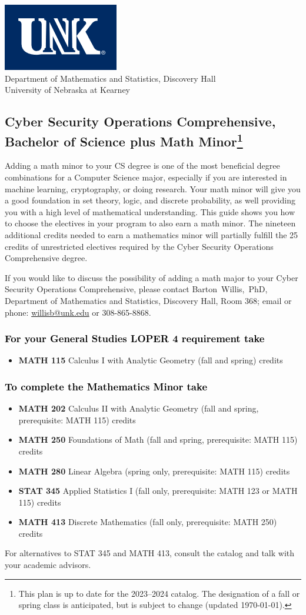 \documentclass[10pt]{article}
\makeatletter
\newenvironment{mypar}[2]
   {\begin{list}{}%
     {\setlength\leftmargin{#1}
     \setlength\rightmargin{#2}}
     \item[]}
   {\end{list}}
\newcommand{\calcone}{\textbf{MATH 115} Calculus I with Analytic Geometry (fall and spring) \dotfill 5 credits}
\newcommand{\calctwo}{\textbf{MATH 202} Calculus II with Analytic Geometry (fall and spring, prerequisite: MATH 115) \dotfill 5 credits }
\newcommand{\foundations}{\textbf{MATH 250} Foundations of Math (fall and spring, prerequisite: MATH 115)  \dotfill 3 credits}
\newcommand{\linear}{\textbf{MATH 280} Linear Algebra (spring only, prerequisite: MATH 115) \dotfill 3 credits}
\newcommand{\discrete}{\textbf{MATH 413} Discrete Mathematics  (fall only, prerequisite: MATH 250)\dotfill 3 credits}
\newcommand{\discreteshort}{MATH 413}
\newcommand{\appliedstat}{\textbf{STAT 345} Applied Statistics I (fall only, prerequisite: MATH 123 or MATH 115) \dotfill 3 credits}
\newcommand{\appliedstatshort}{STAT 345}
\newcommand{\contactbw}{\mbox{Barton Willis, PhD}, Department of Mathematics and Statistics,  Discovery Hall, Room 368;
email or phone: \href{mailto:willisb@unk.edu}{willisb@unk.edu} or 308-865-8868.}
\newcommand{\forinfo}[2]{If you would like to discuss the possibility of adding a math {#1} to your {#2}, please contact \contactbw}
\newcommand{\catalog}{2023--2024 }
\newcommand{\LOPER}{LOPER\xspace}
\newcommand{\myfootnote}{\footnote{This plan is up to date for  the \catalog catalog. The designation of a fall or spring class is 
anticipated, but  is subject to change (updated \today).}}
\newcommand{\myheading}{
\begin{flushleft}
\includegraphics[scale=0.35]{unk-logo}\\
\setcounter{footnote}{0}
\vspace{0.25in}
 \textcolor{unkblue}{Department of Mathematics and Statistics, Discovery Hall} \\
  \textcolor{unkblue}{University of Nebraska at Kearney}
\end{flushleft}}
\makeatother
\begin{document}


\myheading

\subsection*{\textbf{\textcolor{unkblue}{Cyber Security Operations Comprehensive, Bachelor of Science plus Math Minor\myfootnote}}}

Adding a math minor to your CS degree is one of the most beneficial degree combinations 
for a Computer Science major, especially if you are interested in machine learning, 
cryptography,  or doing research.  Your math minor will give you a good foundation in 
set theory, logic, and discrete probability, as well providing you with a high level of 
mathematical understanding. This guide shows you how to choose the electives in your program to also 
earn a math minor. The nineteen additional credits needed to earn a mathematics minor 
will partially fulfill the 25 credits of unrestricted electives required by the 
Cyber Security Operations Comprehensive degree.

 
 \forinfo{major}{Cyber Security Operations Comprehensive}


\vspace{-0.1in}

\subsubsection*{\textcolor{black}{For  your General Studies \LOPER 4 requirement take}}
\begin{itemize}
\item  \calcone
\end{itemize}

\subsubsection*{\textcolor{black}{To complete the Mathematics Minor take}}

\begin{itemize}
\item \calctwo
\item \foundations
\item \linear
\item \appliedstat
\item \discrete
\end{itemize}
\begin{mypar}{0.5cm}{0.5cm}{For alternatives to \appliedstatshort{} and \discreteshort{}, consult  the catalog and talk with your academic advisors.} \end{mypar}
\end{document}
